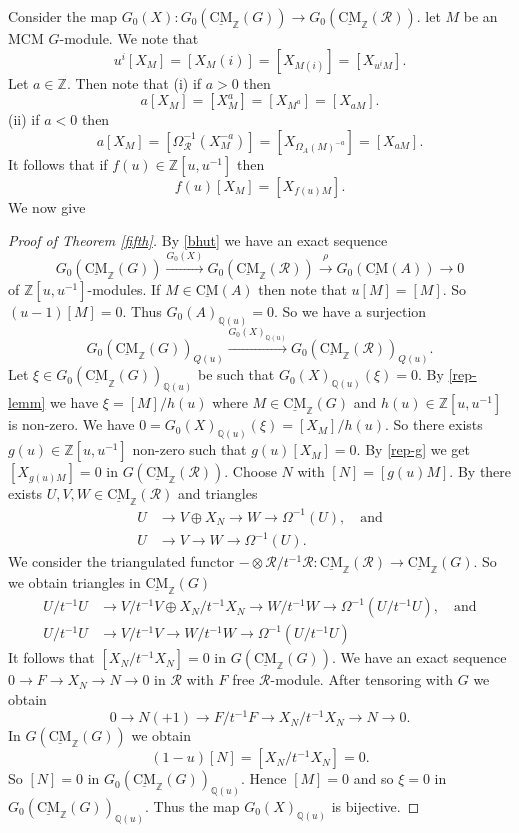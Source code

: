 \documentclass{amsart}
\newcommand{\Z}{\mathbb{Z} }
\newcommand{\Q}{\mathbb{Q} }
\newcommand{\eR}{\mathcal{R} }
\newcommand{\rt}{\rightarrow}
\newcommand{\CMS}{\operatorname{\underline{CM}}}
\theoremstyle{plain}
\theoremstyle{definition}
\theoremstyle{remark}
\begin{document}
{\s\label{rep-g}Consider the map $G_0(X) \colon G_0(\CMS_\Z(G)) \rt G_0(\CMS_\Z(\eR))$. let $M$ be an MCM $G$-module. We note that $$u^i[X_M] = [X_M(i)] = [X_{M(i)}] = [X_{u^iM}].$$
 Let $a \in \Z$. Then note that
 (i)  if $a > 0$ then $$a[X_M] = [X_M^a] = [X_{M^a}] = [X_{a M}].$$
 (ii) if $a< 0$ then $$a[X_M] = [\Omega_{\eR}^{-1}{(X_M^{-a})}] = [X_{\Omega_A(M)^{-a}}] = [X_{a M}].$$
It follows that if $f(u) \in \Z[u,u^{-1}]$ then $$f(u)[X_M] = [X_{f(u)M}].$$
We now give
\begin{proof}[Proof of Theorem \ref{fifth}]
By \ref{bhut} we have an exact sequence $$G_0(\CMS_\Z(G)) \xrightarrow{G_0(X)} G_0(\CMS_\Z(\eR)) \xrightarrow{\rho} G_0(\CMS(A)) \rt 0$$ of $\Z[u,u^{-1}]$-modules.
If $M \in \CMS(A)$ then note that $u[M] = [M]$. So $(u-1)[M] = 0$. Thus $G_0(A)_{\Q(u)} = 0$. So we have a surjection
$$ G_0(\CMS_\Z(G))_{Q(u)} \xrightarrow{G_0(X)_{\Q(u)}} G_0(\CMS_\Z(\eR))_{Q(u)}.$$
Let $\xi \in G_0(\CMS_\Z(G))_{\Q(u)}$ be such that $G_0(X)_{\Q(u)}(\xi) = 0$. By \ref{rep-lemm} we have $\xi = [M]/h(u)$ where $M \in \CMS_\Z(G)$ and $h(u) \in \Z[u,u^{-1}]$ is non-zero.
We have $0 = G_0(X)_{\Q(u)}(\xi)  =  [X_M]/h(u)$. So there exists $g(u) \in \Z[u,u^{-1}]$ non-zero such that $g(u)[X_M] = 0$. By \ref{rep-g} we get $[X_{g(u)M}] = 0$ in $G(\CMS_\Z(\eR))$. Choose $N$ with  $[N] = [g(u)M]$.
By \cite[2.4]{Th} there exists $U, V, W\in \CMS_\Z(\eR)$ and triangles
\begin{align*}
U &\rt V\oplus X_N \rt W \rt \Omega^{-1}(U), \quad \text{and} \\
U &\rt V \rt W \rt \Omega^{-1}(U).
\end{align*}
We consider the triangulated functor  $-\otimes \eR/t^{-1}\eR \colon \CMS_\Z(\eR) \rt \CMS_\Z(G)$. So we obtain triangles in $\CMS_\Z(G)$
\begin{align*}
U/t^{-1}U &\rt V/t^{-1}V\oplus X_N/t^{-1}X_N \rt W/t^{-1}W \rt \Omega^{-1}(U/t^{-1}U), \quad \text{and} \\
U/t^{-1}U &\rt V/t^{-1}V \rt W/t^{-1}W \rt \Omega^{-1}(U/t^{-1}U)
\end{align*}
It follows that $[X_N/t^{-1}X_N] = 0$ in $G(\CMS_\Z(G))$.
We have an exact sequence $0 \rt F \rt X_N \rt N \rt 0$ in $\eR$ with $F$ free $\eR$-module. After tensoring with $G$ we obtain
$$0 \rt N(+1) \rt F/t^{-1}F \rt X_N/t^{-1}X_N \rt N \rt 0.$$
In $G(\CMS_\Z(G))$  we obtain
$$(1-u)[N] = [X_N/t^{-1}X_N ] = 0. $$
So $[N] = 0$ in $G_0(\CMS_\Z(G))_{\Q(u)}$. Hence $[M] = 0$ and so $\xi = 0$ in \\ $G_0(\CMS_\Z(G))_{\Q(u)}$. Thus the map $G_0(X)_{\Q(u)}$ is bijective.
\end{proof}

}
\end{document}

